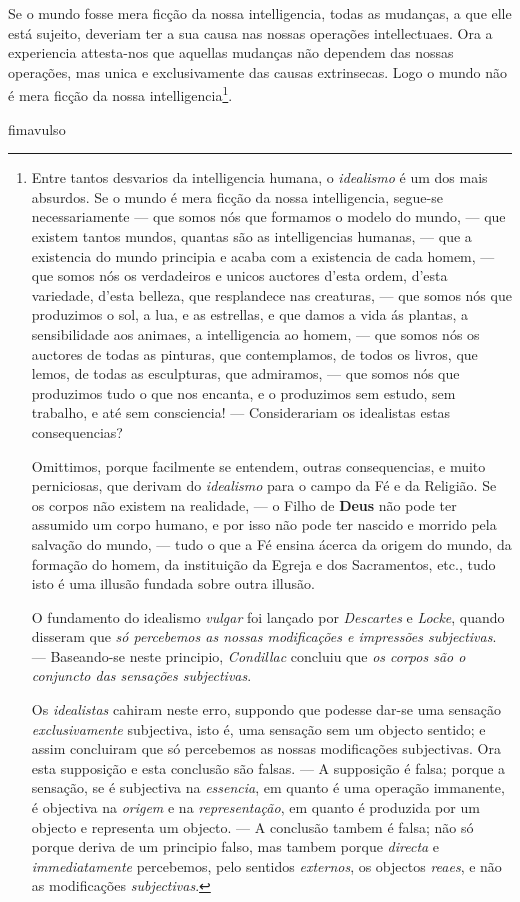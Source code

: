  Se o mundo fosse mera ficção da nossa intelligencia, todas as mudanças, a que
elle está sujeito, deveriam ter a sua causa nas nossas operações intellectuaes. Ora a
experiencia attesta-nos que aquellas mudanças não dependem das nossas operações, mas
unica e exclusivamente das causas extrinsecas. Logo o mundo não é mera ficção da nossa
intelligencia\footnote{Entre tantos desvarios da intelligencia humana, o
\emph{idealismo} é um dos mais absurdos. Se o mundo é mera ficção da nossa intelligencia,
segue-se necessariamente --- que somos nós que formamos o modelo do mundo, --- que
existem tantos mundos, quantas são as intelligencias humanas, --- que a existencia do
mundo principia e acaba com a existencia de cada homem, --- que somos nós os verdadeiros
e unicos auctores d'esta ordem, d'esta variedade, d'esta belleza, que resplandece nas
creaturas, --- que somos nós que produzimos o sol, a lua, e as estrellas, e que damos a
vida ás plantas, a sensibilidade aos animaes, a intelligencia ao homem, --- que somos nós
os auctores de todas as pinturas, que contemplamos, de todos os livros, que lemos, de
todas as esculpturas, que admiramos, --- que somos nós que produzimos tudo o que nos
encanta, e o produzimos sem estudo, sem trabalho, e até sem consciencia! ---
Considerariam os idealistas estas consequencias?

Omittimos, porque facilmente se entendem, outras consequencias, e muito perniciosas, que
derivam do \emph{idealismo} para o campo da Fé e da Religião. Se os corpos não existem na
realidade, --- o Filho de \textbf{Deus} não pode ter assumido um corpo humano, e por isso
não pode ter nascido e morrido pela salvação do mundo, --- tudo o que a Fé ensina ácerca
da origem do mundo, da formação do homem, da instituição da Egreja e dos Sacramentos,
etc., tudo isto é uma illusão fundada sobre outra illusão.

O fundamento do idealismo \emph{vulgar} foi lançado por \emph{Descartes} e \emph{Locke},
quando disseram que \emph{só percebemos as nossas modificações e impressões subjectivas}.
--- Baseando-se neste principio, \emph{Condillac} concluiu que \emph{os corpos são o
conjuncto das sensações subjectivas}.

Os \emph{idealistas} cahiram neste erro, suppondo que podesse dar-se uma sensação
\emph{exclusivamente} subjectiva, isto é, uma sensação sem um objecto sentido; e assim
concluiram que só percebemos as nossas modificações subjectivas. Ora esta supposição e
esta conclusão são falsas. --- A supposição é falsa; porque a sensação, se é subjectiva
na \emph{essencia}, em quanto é uma operação immanente, é objectiva na \emph{origem} e na
\emph{representação}, em quanto é produzida por um objecto e representa um objecto. --- A
conclusão tambem é falsa; não só porque deriva de um principio falso, mas tambem porque
\emph{directa} e \emph{immediatamente} percebemos, pelo sentidos \emph{externos}, os
objectos \emph{reaes}, e não as modificações \emph{subjectivas}.}.

\csname fimavulso\endcsname
